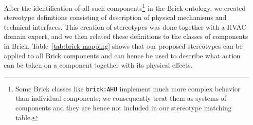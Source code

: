 \documentclass[sigconf]{acmart}
\begin{document}


After the identification of all such components\footnote{Some Brick classes like \texttt{brick:AHU} implement much more complex behavior than individual components; we consequently treat them as systems of components and they are hence not included in our stereotype matching table.} in the Brick ontology, we created stereotype definitions consisting of description of physical mechanisms and technical interfaces. This creation of stereotypes was done together with a HVAC domain expert, and we then related these definitions to the classes of components in Brick. Table~\ref{tab:brick-mapping} shows that our proposed stereotypes can be applied to all Brick components and can hence be used to describe what action can be taken on a component together with its physical effects.
\end{document}
